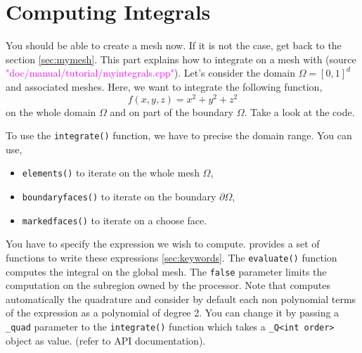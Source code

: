 %

\section{Computing Integrals}
\label{sec:myintegrals}

You should be able to create a mesh now. If it is not the case, get back to the
section \ref{sec:mymesh}. This part explains how to integrate on a mesh with \feel
(source \textcolor{magenta}{"doc/manual/tutorial/myintegrals.cpp"}).
Let's consider the domain $\Omega=[0,1]^d$ and associated meshes.
Here, we want to integrate the following function,
%
\begin{equation}
    f(x,y,z) = x^2 + y^2 + z^2
\end{equation}
%
on the whole domain $\Omega$ and on part of the boundary $\Omega$. Take a look at the code.
%
\vspace{2mm}

\vspace{2mm}
%
To use the \lstinline!integrate()! function, we have to precise the domain range. You can use,
\begin{itemize}
    \item \lstinline!elements()! to iterate on the whole mesh $\Omega$,
    \item \lstinline!boundaryfaces()! to iterate on the boundary $\partial\Omega$,
    \item \lstinline!markedfaces()! to iterate on a choose face.
\end{itemize}
%
You have to specify the expression we wish to compute. \feel provides a set of functions
to write these expressions \ref{sec:keywords}.
The \lstinline!evaluate()! function computes the integral on the global mesh.
The \lstinline!false! parameter limits the computation on the subregion owned by
the processor.
%
Note that \feel computes automatically the quadrature and consider by default each
non polynomial terms of the expression as a polynomial of degree 2. You can change
it by passing a \lstinline!_quad! parameter to the \lstinline!integrate()! function 
which takes a \lstinline!_Q<int order>! object as value.
(refer to API documentation).



